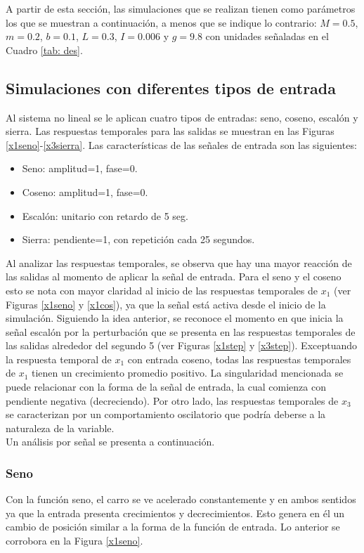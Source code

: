 \documentclass[journal]{IEEEtran}
\begin{document}
A partir de esta sección, las simulaciones que se realizan tienen como parámetros los que se muestran a continuación, a menos que se indique lo contrario: $M=0.5$, $m=0.2$, $b=0.1$, $L=0.3$, $I=0.006$ y $g=9.8$ con unidades señaladas en el Cuadro \ref{tab: des}.

\subsection{Simulaciones con diferentes tipos de entrada}
Al sistema no lineal se le aplican cuatro tipos de entradas: seno, coseno, escalón y sierra. Las respuestas temporales para las salidas se muestran en las Figuras \ref{x1seno}-\ref{x3sierra}. Las características de las señales de entrada son las siguientes:
\begin{itemize}
\item Seno: amplitud=1, fase=0.
\item Coseno: amplitud=1, fase=0.
\item Escalón: unitario con retardo de 5 seg.
\item Sierra: pendiente=1, con repetición cada 25 segundos. 
\end{itemize}
\textbf{}

Al analizar las respuestas temporales, se observa que hay una mayor reacción de las salidas al momento de aplicar la señal de entrada. Para el seno y el coseno esto se nota con mayor claridad al inicio de las respuestas temporales de $x_1$ (ver Figuras \ref{x1seno} y \ref{x1cos}), ya que la señal está activa desde el inicio de la simulación. Siguiendo la idea anterior, se reconoce el momento en que inicia la señal escalón por la perturbación que se presenta en las respuestas temporales de las salidas alrededor del segundo 5 (ver Figuras \ref{x1step} y \ref{x3step}). Exceptuando la respuesta temporal de $x_1$ con entrada coseno, todas las respuestas temporales de $x_1$ tienen un crecimiento promedio positivo. La singularidad mencionada se puede relacionar con la forma de la señal de entrada, la cual comienza con pendiente negativa (decreciendo). Por otro lado, las respuestas temporales de $x_3$ se caracterizan por un comportamiento oscilatorio que podría deberse a la naturaleza de la variable.\\ 

Un análisis por señal se presenta a continuación. 

\subsubsection*{Seno}
Con la función seno, el carro se ve acelerado constantemente y en ambos sentidos ya que la entrada presenta crecimientos y decrecimientos. Esto genera en él un cambio de posición similar a la forma de la función de entrada. Lo anterior se corrobora en la Figura \ref{x1seno}.\\ 
\end{document}
